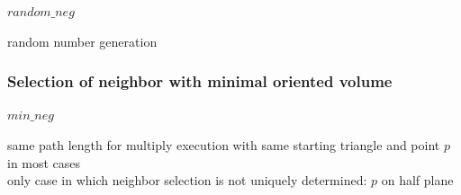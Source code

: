 \documentclass[10pt]{article}
\begin{document}
$ random\_neg $

random number generation

\subsubsection{Selection of neighbor with minimal oriented volume}

$ min\_neg $

same path length for multiply execution with same starting triangle and point $p$ in most cases\\
only case in which neighbor selection is not uniquely determined: $p$ on half plane


\begin{figure}[h]
\end{figure}
\end{document}
